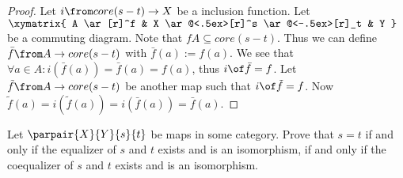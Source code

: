 \begin{answer}
  \begin{proof}
    Let $i \from core(s-t) \to X$ be a inclusion function. Let
    $\xymatrix{
      A \ar[r]^f & X \ar@<.5ex>[r]^s \ar@<-.5ex>[r]_t & Y
    }$
    be a commuting diagram. Note that $f A \subseteq core(s-t)$.
    Thus we can define $\bar{f} \from A \to core(s-t)$ with $\bar{f}(a) := f(a)$.
    We see that $\forall a \in A: i(\bar{f}(a))=\bar{f}(a)=f(a)$, thus $i \of \bar{f} = f$.
    Let $\tilde{f} \from A \to core(s-t)$ be another map such that $i \of \tilde{f} = f$.
    Now $\tilde{f}(a) = i(\tilde{f}(a)) = i(\bar{f}(a)) = \bar{f}(a)$.
  \end{proof}
\end{answer}

\begin{exercise}
  Let $\parpair{X}{Y}{s}{t}$ be maps in some category.  Prove that $s = t$ if
  and only if the equalizer of $s$ and $t$ exists and is an isomorphism, if
  and only if the coequalizer of $s$ and $t$ exists and is an isomorphism.
\end{exercise}

